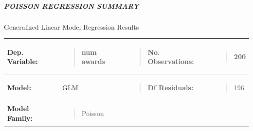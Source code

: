 \subparagraph{POISSON REGRESSION
SUMMARY}\label{poisson-regression-summary}

Generalized Linear Model Regression Results

{\def\LTcaptype{none} %
\begin{longtable}[]{@{}
  >{\raggedright\arraybackslash}p{}
  >{\centering\arraybackslash}p{}
  >{\raggedright\arraybackslash}p{}
  >{\raggedright\arraybackslash}p{}@{}}
\toprule\noalign{}
\begin{minipage}[b]{\linewidth}\raggedright
\textbf{Dep. Variable:}
\end{minipage} & \begin{minipage}[b]{\linewidth}\raggedright
\begin{quote}
num awards
\end{quote}
\end{minipage} & \begin{minipage}[b]{\linewidth}\raggedright
\begin{quote}
\textbf{No. Observations:}
\end{quote}
\end{minipage} & \begin{minipage}[b]{\linewidth}\raggedright
\begin{quote}
200
\end{quote}
\end{minipage} \\
\midrule\noalign{}
\endhead
\bottomrule\noalign{}
\endlastfoot
\textbf{Model:} & GLM & \begin{minipage}[t]{\linewidth}\raggedright
\begin{quote}
\textbf{Df Residuals:}
\end{quote}
\end{minipage} & \begin{minipage}[t]{\linewidth}\raggedright
\begin{quote}
196
\end{quote}
\end{minipage} \\
\textbf{Model Family:} & \begin{minipage}[t]{\linewidth}\raggedright
\begin{quote}
Poisson
\end{quote}
\end{minipage} & \begin{minipage}[t]{\linewidth}\raggedright

\end{minipage}
\end{longtable}}
